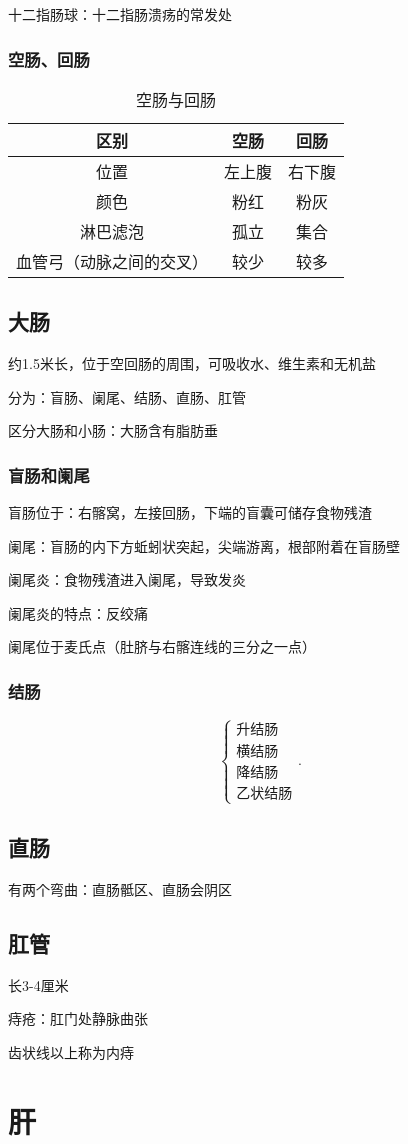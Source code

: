 \begin{notation}
    十二指肠球：十二指肠溃疡的常发处
\end{notation}
\subsubsection{空肠、回肠}%
\label{subsub:肠-回肠-}
\begin{table}[htpb]
    \centering
    \caption{空肠与回肠}
    \label{tab:空肠与回肠}
    \begin{tabular}{ccc}
    \toprule
    区别 & 空肠 & 回肠\\
    \midrule
    位置 & 左上腹 & 右下腹\\
    颜色 & 粉红 & 粉灰\\
    淋巴滤泡 & 孤立 & 集合\\
    血管弓（动脉之间的交叉）& 较少 & 较多\\ 
    \bottomrule
    \end{tabular}
\end{table}
\subsection{大肠}%
\label{sub:大肠}
约1.5米长，位于空回肠的周围，可吸收水、维生素和无机盐

分为：盲肠、阑尾、结肠、直肠、肛管
\begin{notation}
    区分大肠和小肠：大肠含有脂肪垂
\end{notation}
\subsubsection{盲肠和阑尾}%
\label{subsub:肠和阑尾-}
盲肠位于：右髂窝，左接回肠，下端的盲囊可储存食物残渣

阑尾：盲肠的内下方蚯蚓状突起，尖端游离，根部附着在盲肠壁
\begin{notation}
    阑尾炎：食物残渣进入阑尾，导致发炎

    阑尾炎的特点：反绞痛

    阑尾位于麦氏点（肚脐与右髂连线的三分之一点）
\end{notation}
\subsubsection{结肠}%
\label{subsub:肠-}
\[
    \begin{cases}
        \text{升结肠}\\
        \text{横结肠}\\
        \text{降结肠}\\
        \text{乙状结肠}
    \end{cases}
.\] 
\subsection{直肠}%
\label{sub:直肠}
有两个弯曲：直肠骶区、直肠会阴区
\subsection{肛管}%
\label{sub:肛管}
长3-4厘米
\begin{notation}
    痔疮：肛门处静脉曲张

    齿状线以上称为内痔
\end{notation}
\section{肝}%
\label{sec:肝}



